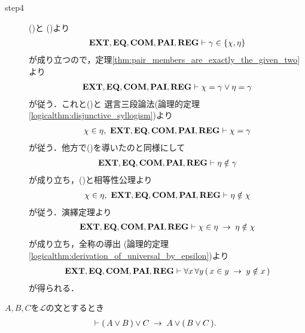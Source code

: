 \begin{sketch}
\begin{description}
			\item[step4] ()と
				()より
				\begin{align}
					\mbox{{\bf EXT}},\mbox{{\bf EQ}},\mbox{\bf COM},\mbox{{\bf PAI}},\mbox{{\bf REG}} \vdash \gamma \in \{\chi,\eta\}
				\end{align}
				が成り立つので，定理\ref{thm:pair_members_are_exactly_the_given_two}より
				\begin{align}
					\mbox{{\bf EXT}},\mbox{{\bf EQ}},\mbox{\bf COM},\mbox{{\bf PAI}},\mbox{{\bf REG}} \vdash 
					\chi = \gamma \vee \eta = \gamma
				\end{align}
				が従う．これと()と
				選言三段論法(論理的定理\ref{logicalthm:disjunctive_syllogism})より
				\begin{align}
					\chi \in \eta,\ \mbox{{\bf EXT}},\mbox{{\bf EQ}},\mbox{\bf COM},\mbox{{\bf PAI}},\mbox{{\bf REG}} \vdash 
					\chi = \gamma
					\label{fom:no_pair_of_sets_go_round_9}
				\end{align}
				が従う．他方で()を導いたのと同様にして
				\begin{align}
					\mbox{{\bf EXT}},\mbox{{\bf EQ}},\mbox{\bf COM},\mbox{{\bf PAI}},\mbox{{\bf REG}} \vdash \eta \notin \gamma
				\end{align}
				が成り立ち，()と相等性公理より
				\begin{align}
					\chi \in \eta,\ \mbox{{\bf EXT}},\mbox{{\bf EQ}},\mbox{\bf COM},\mbox{{\bf PAI}},\mbox{{\bf REG}} \vdash 
					\eta \notin \chi
				\end{align}
				が従う．演繹定理より
				\begin{align}
					\mbox{{\bf EXT}},\mbox{{\bf EQ}},\mbox{\bf COM},\mbox{{\bf PAI}},\mbox{{\bf REG}} \vdash 
					\chi \in \eta \hspace{0.25em}\rightarrow\hspace{0.25em} \eta \notin \chi
				\end{align}
				が成り立ち，全称の導出
				(論理的定理\ref{logicalthm:derivation_of_universal_by_epsilon})より
				\begin{align}
					\mbox{{\bf EXT}},\mbox{{\bf EQ}},\mbox{\bf COM},\mbox{{\bf PAI}},\mbox{{\bf REG}} \vdash 
					\forall x\, \forall y\, (\, x \in y \hspace{0.25em}\rightarrow\hspace{0.25em} y \notin x\, )
				\end{align}
				が得られる．
				\QED
		\end{description}
	\end{sketch}
	
	\begin{screen}
		\begin{logicalthm}[論理和の結合律]
		\label{logicalthm:associative_law_of_disjunctions}
			$A,B,C$を$\mathcal{L}$の文とするとき
			\begin{align}
				\vdash (\, A \vee B\, ) \vee C \hspace{0.25em}\rightarrow\hspace{0.25em} A \vee (\, B \vee C\, ).
			\end{align}
		\end{logicalthm}
	\end{screen}
	
